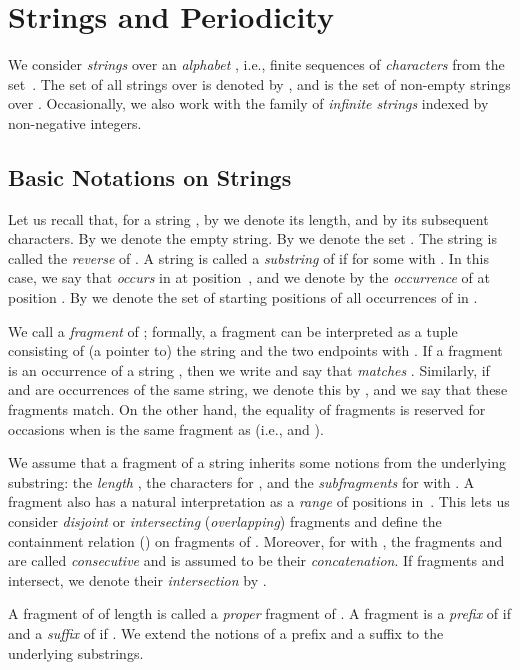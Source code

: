 \documentclass[a4paper]{article}
\theoremstyle{definition}
\theoremstyle{remark}
\begin{document}
\section{Strings and Periodicity}\label{chp:prelim}

We consider \emph{strings} over an \emph{alphabet} , i.e., finite sequences of \emph{characters} from the set~.
The set of all strings over  is denoted by , and  is the set of non-empty strings over .
Occasionally, we also work with the family  of \emph{infinite strings} indexed by non-negative integers.


\subsection{Basic Notations on Strings}\label{sec:comb}
Let us recall that, for a string , by  we denote its length, and by  its subsequent characters.
By  we denote the empty string.
By  we denote the set .
The string  is called the \emph{reverse} of .
A string  is called a \emph{substring} of  if 
for some  with .
In this case, we say that  \emph{occurs} in  at position~, and we denote by 
the \emph{occurrence} of  at position .
By  we denote the set of starting positions of all occurrences of  in .

We call  a \emph{fragment} of ; formally, a fragment can be interpreted as a tuple
consisting of (a pointer to) the string  and the two endpoints  with .
If a fragment  is an occurrence of a string , then we write  and say that  \emph{matches} .
Similarly, if  and  are occurrences of the same string, we denote this by ,
and we say that these fragments match.
On the other hand, the equality of fragments  is reserved for occasions when  is the same fragment as  (i.e.,  and ). 

We assume that a fragment  of a string  inherits some notions from the underlying substring: the \emph{length} , the characters  for , and the \emph{subfragments}  for  with .
A fragment  also has a natural interpretation as a \emph{range}  of positions in~.
This lets us consider \emph{disjoint} or \emph{intersecting} (\emph{overlapping}) fragments and define the containment relation () on fragments of . 
Moreover, for  with , the fragments  and  are called \emph{consecutive} and  is assumed to be their \emph{concatenation}.
If fragments  and  intersect, we denote their \emph{intersection}  by .
 
A fragment  of  of length  is called a \emph{proper} fragment of .
A fragment  is a \emph{prefix} of  if  and a \emph{suffix} of  if .
We extend the notions of a prefix and a suffix to the underlying substrings.  
\end{document}

